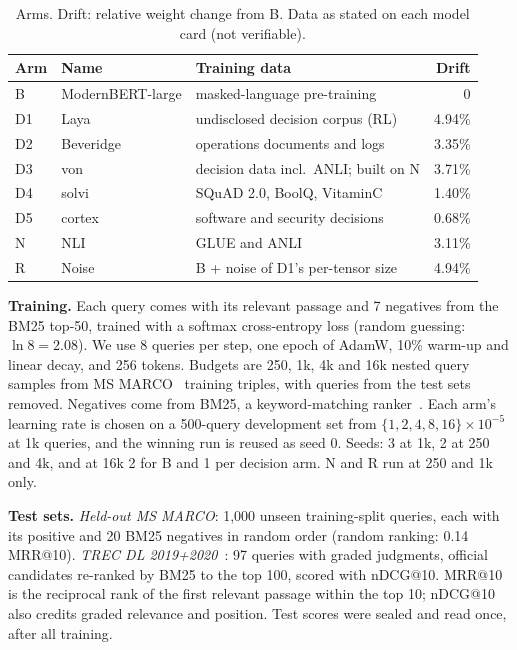 \documentclass[conference]{IEEEtran}
\makeatletter
\newcommand{\ms}{MRR@10}
\newcommand{\nd}{nDCG@10}
\makeatother
\begin{document}
\begin{table}[t]
\centering
\caption{Arms. Drift: relative weight change from B. Data as stated on each model card (not verifiable).}
\label{tab:arms}
\setlength{\tabcolsep}{3pt}
\footnotesize
\begin{tabular}{@{}l l p{3.6cm} r@{}}
\toprule
Arm & Name & Training data & Drift \\
\midrule
B & ModernBERT-large & masked-language pre-training & 0 \\
D1 & Laya & undisclosed decision corpus (RL) & 4.94\% \\
D2 & Beveridge & operations documents and logs & 3.35\% \\
D3 & von & decision data incl.\ ANLI; built on N & 3.71\% \\
D4 & solvi & SQuAD 2.0, BoolQ, VitaminC & 1.40\% \\
D5 & cortex & software and security decisions & 0.68\% \\
N & NLI & GLUE and ANLI~\cite{sileo2024tasksource} & 3.11\% \\
R & Noise & B + noise of D1's per-tensor size & 4.94\% \\
\bottomrule
\end{tabular}
\end{table}

\textbf{Training.} Each query comes with its relevant passage and 7 negatives from the BM25 top-50, trained with a softmax cross-entropy loss (random guessing: $\ln 8=2.08$). We use 8 queries per step, one epoch of AdamW, 10\% warm-up and linear decay, and 256 tokens. Budgets are 250, 1k, 4k and 16k nested query samples from MS MARCO~\cite{nguyen2016msmarco} training triples, with queries from the test sets removed. Negatives come from BM25, a keyword-matching ranker~\cite{robertson2009bm25}. Each arm's learning rate is chosen on a 500-query development set from $\{1,2,4,8,16\}\times10^{-5}$ at 1k queries, and the winning run is reused as seed 0. Seeds: 3 at 1k, 2 at 250 and 4k, and at 16k 2 for B and 1 per decision arm. N and R run at 250 and 1k only.

\textbf{Test sets.} \emph{Held-out MS MARCO}: 1{,}000 unseen training-split queries, each with its positive and 20 BM25 negatives in random order (random ranking: 0.14 \ms{}). \emph{TREC DL 2019+2020}~\cite{craswell2020dl19,craswell2021dl20}: 97 queries with graded judgments, official candidates re-ranked by BM25 to the top 100, scored with \nd{}. \ms{} is the reciprocal rank of the first relevant passage within the top 10; \nd{} also credits graded relevance and position. Test scores were sealed and read once, after all training.
\end{document}
